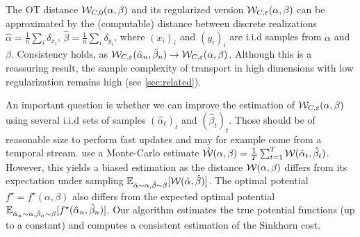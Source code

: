 The OT distance $\mathcal{W}_{C,0}(\alpha,\beta)$ and its regularized version
$\mathcal{W}_{C,\varepsilon}(\alpha,\beta)$ can be approximated by the (computable)
distance between discrete realizations $\hat \alpha = \frac{1}{n} \sum_i
\delta_{x_i}$, $\hat \beta = \frac{1}{n} \sum_i \delta_{y_i}$, where ${(x_i)}_i$
and ${(y_i)}_i$ are i.i.d samples from $\alpha$ and $\beta$.  Consistency holds,
as $\mathcal{W}_{C,\varepsilon}(\hat \alpha_n, \hat \beta_n) \to \mathcal{W}_{C,\varepsilon}(\alpha,
\beta)$. Although this is a reassuring result, the sample complexity of
transport in high dimensions with low regularization remains high (see
\autoref{sec:related}).


An important question is whether we can improve the estimation of
$\mathcal{W}_{C,\varepsilon}(\alpha,\beta)$ using several i.i.d sets of samples $(\hat
\alpha_t)_t$ and ${(\hat \beta_t)}_t$. Those should be of reasonable size to
perform fast updates and may for example come from a temporal stream.
\citet{2018-Genevay-aistats} use a Monte-Carlo estimate $\hat {\mathcal{W}}(\alpha, \beta)
= \frac{1}{T} \sum_{t=1}^T \mathcal{W}(\hat \alpha_t, \hat \beta_t)$. However, this
yields a biased estimation as the distance $\mathcal{W}(\alpha, \beta)$ differs from its
expectation under sampling $\mathbb{E}_{\hat \alpha \sim \alpha, \hat \beta \sim \beta}
[\mathcal{W}(\hat \alpha, \hat \beta)]$. The optimal potential
$f^\star=f^\star(\alpha, \beta)$ also differs from the expected optimal
potential $\mathbb{E}_{\hat \alpha_n \sim \alpha, \hat \beta_n \sim \beta}[f^\star(\hat
\alpha_n, \hat \beta_n)]$. Our algorithm estimates the true
potential functions (up to a constant) and computes a consistent estimation of
the Sinkhorn cost.